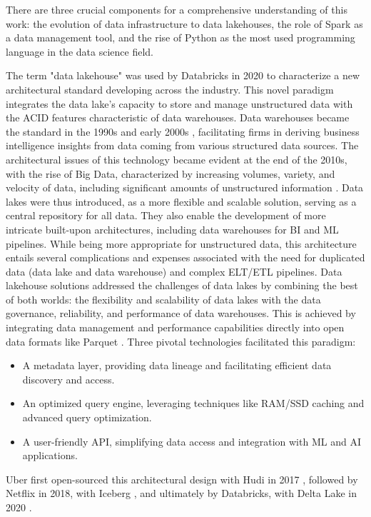There are three crucial components for a comprehensive understanding of this work: the evolution of data infrastructure to data lakehouses, the role of Spark as a data management tool, and the rise of Python as the most used programming language in the data science field.

\smallskip

The term "data lakehouse" was used by Databricks in 2020 \cite{WhatLakehouse2020} to characterize a new architectural standard developing across the industry. This novel paradigm integrates the data lake's capacity to store and manage unstructured data with the \gls{ACID} features characteristic of data warehouses.
Data warehouses became the standard in the 1990s and early 2000s \cite{chaudhuriOverviewDataWarehousing1997}, facilitating firms in deriving business intelligence insights from data coming from various structured data sources. The architectural issues of this technology became evident at the end of the 2010s, with the rise of Big Data, characterized by increasing volumes, variety, and velocity of data, including significant amounts of unstructured information \cite{ederUnstructuredData802008}. 
Data lakes were thus introduced, as a more flexible and scalable solution, serving as a central repository for all data. They also enable the development of more intricate built-upon architectures, including data warehouses for \gls{BI} and \gls{ML} pipelines. While being more appropriate for unstructured data, this architecture entails several complications and expenses associated with the need for duplicated data (data lake and data warehouse) and complex \gls{ELT}/\gls{ETL} pipelines.
Data lakehouse solutions addressed the challenges of data lakes by combining the best of both worlds: the flexibility and scalability of data lakes with the data governance, reliability, and performance of data warehouses. This is achieved by integrating data management and performance capabilities directly into open data formats like Parquet \cite{DremelMadeSimple}. Three pivotal technologies facilitated this paradigm:
\begin{itemize}
    \item A metadata layer, providing data lineage and facilitating efficient data discovery and access.
    \item An optimized query engine, leveraging techniques like \gls{RAM}/\gls{SSD} caching and advanced query optimization.
    \item A user-friendly API, simplifying data access and integration with \gls{ML} and \gls{AI} applications.
\end{itemize}
Uber first open-sourced this architectural design with Hudi in 2017 \cite{rajaperumalUberEngineeringIncremental2017}, followed by Netflix in 2018, with Iceberg \cite{IcebergExamples2024}, and ultimately by Databricks, with Delta Lake in 2020 \cite{armbrustDeltaLakeHighperformance2020}.

